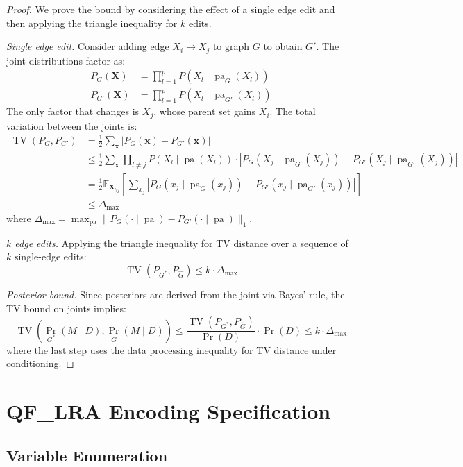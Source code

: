 \documentclass[11pt]{article}
\DeclareMathOperator{\TV}{TV}
\DeclareMathOperator{\Pr}{Pr}
\DeclareMathOperator{\pa}{pa}
\begin{document}
\begin{proof}
We prove the bound by considering the effect of a single edge edit and then applying the triangle inequality for $k$ edits.

\emph{Single edge edit.}
Consider adding edge $X_i \to X_j$ to graph $G$ to obtain $G'$.
The joint distributions factor as:
\begin{align*}
  P_G(\mathbf{X}) &= \prod_{l=1}^p P(X_l \mid \pa_G(X_l)) \\
  P_{G'}(\mathbf{X}) &= \prod_{l=1}^p P(X_l \mid \pa_{G'}(X_l))
\end{align*}
The only factor that changes is $X_j$, whose parent set gains $X_i$.
The total variation between the joints is:
\begin{align*}
  \TV(P_G, P_{G'}) &= \frac{1}{2}\sum_{\mathbf{x}} |P_G(\mathbf{x}) - P_{G'}(\mathbf{x})| \\
  &\leq \frac{1}{2}\sum_{\mathbf{x}} \prod_{l \neq j} P(X_l \mid \pa(X_l)) \cdot |P_G(X_j \mid \pa_G(X_j)) - P_{G'}(X_j \mid \pa_{G'}(X_j))| \\
  &= \frac{1}{2} \mathbb{E}_{\mathbf{X}_{\setminus j}}\!\left[\sum_{x_j} |P_G(x_j \mid \pa_G(x_j)) - P_{G'}(x_j \mid \pa_{G'}(x_j))|\right] \\
  &\leq \Delta_{\max}
\end{align*}
where $\Delta_{\max} = \max_{\pa} \|P_G(\cdot \mid \pa) - P_{G'}(\cdot \mid \pa)\|_1$.

\emph{$k$ edge edits.}
Applying the triangle inequality for TV distance over a sequence of $k$ single-edge edits:
\[
  \TV(P_{G^*}, P_{\hat{G}}) \leq k \cdot \Delta_{\max}
\]

\emph{Posterior bound.}
Since posteriors are derived from the joint via Bayes' rule, the TV bound on joints implies:
\[
  \TV\!\left(\Pr_{G^*}(M \mid D), \Pr_{\hat{G}}(M \mid D)\right) \leq \frac{\TV(P_{G^*}, P_{\hat{G}})}{\Pr(D)} \cdot \Pr(D) \leq k \cdot \Delta_{\max}
\]
where the last step uses the data processing inequality for TV distance under conditioning. \qedhere
\end{proof}

\section{QF\_LRA Encoding Specification}
\label{app:encoding}

\subsection{Variable Enumeration}
\end{document}

